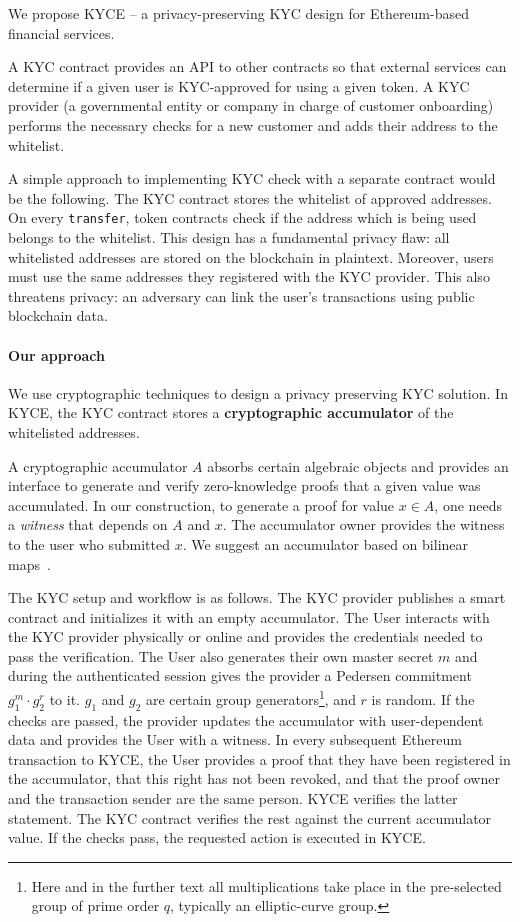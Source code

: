 We propose KYCE -- a privacy-preserving KYC design for Ethereum-based financial services.

A KYC contract provides an API to other contracts so that external services can determine if a given user is KYC-approved for using a given token.
A KYC provider (a governmental entity or company in charge of customer onboarding) performs the necessary checks for a new customer and adds their address to the whitelist.

A simple approach to implementing KYC check with a separate contract would be the following.
The KYC contract stores the whitelist of approved addresses.
On every \texttt{transfer}, token contracts check if the address which is being used belongs to the whitelist.
This design has a fundamental privacy flaw: all whitelisted addresses are stored on the blockchain in plaintext.
Moreover, users must use the same addresses they registered with the KYC provider.
This also threatens privacy: an adversary can link the user's transactions using public blockchain data.

\paragraph{Our approach}
We use cryptographic techniques to design a privacy preserving KYC solution.
In KYCE, the KYC contract stores a \textbf{cryptographic accumulator} of the whitelisted addresses. 

A cryptographic accumulator $A$ absorbs certain algebraic objects and provides an interface to generate and verify zero-knowledge proofs that a given value was accumulated.
In our construction, to generate a proof for value $x\in A$, one needs a \textit{witness} that depends on $A$ and $x$.
The accumulator owner provides the witness to the user who submitted $x$.
We suggest an accumulator based on bilinear maps~\cite{Camenisch2009}.

The KYC setup and workflow is as follows.
The KYC provider publishes a smart contract and initializes it with an empty accumulator.
The User interacts with the KYC provider physically or online and provides the credentials needed to pass the verification.
The User also generates their own master secret $m$ and during the authenticated session gives the provider a Pedersen commitment $g_1^m\cdot g_2^r$ to it.
$g_1$ and $g_2$ are certain group generators\footnote{Here and in the further text all multiplications take place in the pre-selected group of prime order $q$, typically an elliptic-curve group.}, and $r$ is random.
If the checks are passed, the provider updates the accumulator with user-dependent data and provides the User with a witness.
In every subsequent Ethereum transaction to KYCE, the User provides a proof that they have been registered in the accumulator, that this right has not been revoked, and that the proof owner and the transaction sender are the same person.
KYCE verifies the latter statement.
The KYC contract verifies the rest against the current accumulator value.
If the checks pass, the requested action is executed in KYCE.

